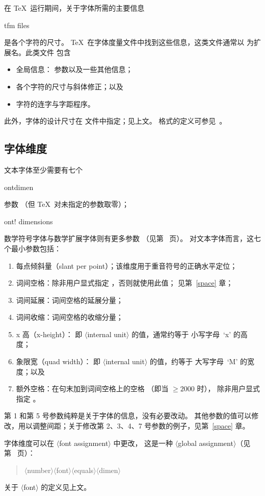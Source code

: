\documentclass[a4paper]{rapport3}
\makeatletter
\def\gr#1{$\langle$#1$\rangle$}\def\key#1{{\tt#1}}
\newenvironment{Disp}{\begin{quotation}}{\end{quotation}}
\def\term#1\par{\index{#1}}
\def\cstoidx#1\par{\index{#1@\cs{#1}}}
\def\csidx#1{\cstoidx #1\par\cs{#1}}
\makeatother
\begin{document}
在 \TeX\ 运行期间，关于字体所需的主要信息
\term \n{tfm} files\par
是各个字符的尺寸。
\TeX\ 在字体度量文件中找到这些信息，这类文件通常以  为扩展名。此类文件
包含 \begin{itemize} \item 全局信息： 参数以及一些其他信息；
\item 各个字符的尺寸与斜体修正；以及
\altt
\item 字符的连字与字距程序。
\end{itemize}
此外，字体的设计尺寸在  文件中指定；见上文。 格式的定义可参见~\cite{Knuth:TeXprogram}。

\subsection{字体维度}
\label{font:dims}

文本字体至少需要有七个 \csidx{fontdimen} 参数
（但 \TeX\ 对未指定的参数取零）；
\term font! dimensions\par
数学符号字体与数学扩展字体则有更多参数
（见第~\pageref{fam23:fontdims} 页）。
对文本字体而言，这七个最小参数包括：
\begin{enumerate} \item 每点倾斜量（slant per point）；该维度用于重音符号的正确水平定位；
\awp
\item 词间空格：除非用户显式指定 ，否则就使用此值；
    见第~\ref{space} 章；
\item 词间延展：词间空格的延展分量；
\item 词间收缩：词间空格的收缩分量；
\item x 高（x-height）：
    即 \gr{internal unit}  的值，通常约等于
    小写字母~`x' 的高度；
\item 象限宽（quad width）：
    即 \gr{internal unit}  的值，约等于
    大写字母~`M' 的宽度；以及
\item 额外空格：在句末加到词间空格上的空格
（即当 ${}\geq2000$ 时），
除非用户显式指定 。
\end{enumerate}

第 1 和第 5 号参数纯粹是关于字体的信息，没有必要改动。
其他参数的值可以修改，用以调整间距；关于修改第 2、3、4、7 号参数的例子，见第~\ref{space} 章。

字体维度可以在 \gr{font assignment} 中更改，
这是一种 \gr{global assignment}（见第~\pageref{global:assign} 页）：
\begin{Disp}\gr{number}\gr{font}\gr{equals}\gr{dimen}
\end{Disp} 关于 \gr{font} 的定义见上文。
\end{document}

